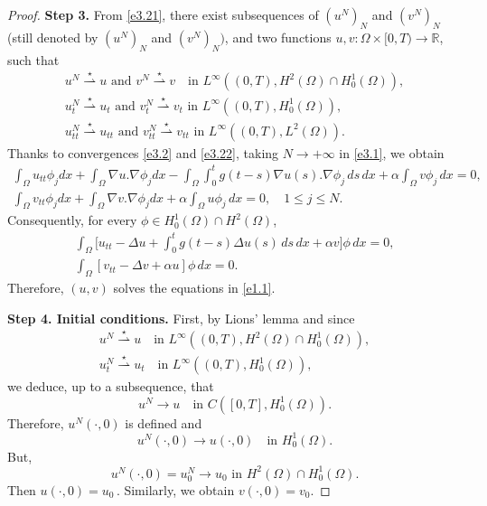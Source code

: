 \documentclass[11pt]{article}
\numberwithin{equation}{section}
\begin{document}
\begin{proof}
\noindent\textbf{Step 3.}
From \eqref{e3.21}, there exist subsequences of $(u^{N})_{N}$ and $(v^{N})_{N}$
(still denoted by $(u^{N})_{N}$ and $(v^{N})_{N})$, and two functions
$u, v : \Omega \times [0, T) \to \mathbb{R}$, such that
\begin{equation}
\begin{gathered}
u^{N} \overset{\star}{\rightharpoonup} u \text{ and }
 v^{N} \overset{\star}{\rightharpoonup} v \quad \text{in }
 L^\infty((0,T), H^2(\Omega) \cap H_0^1 (\Omega)), \\
u_{t}^{N} \overset{\star}{\rightharpoonup} u_{t} \text{ and }
 v_{t}^{N} \overset{\star}{\rightharpoonup} v_{t} \text{ in } L^\infty((0,T),
 H^1_0(\Omega)), \\
 u_{tt}^{N} \overset{\star}{\rightharpoonup} u_{tt} \text{ and }
 v_{tt}^{N} \overset{\star}{\rightharpoonup} v_{tt} \text{ in }
 L^\infty((0,T), L^2(\Omega)).
\end{gathered}\label{e3.22}
\end{equation}
Thanks to convergences \eqref{e3.2} and \eqref{e3.22}, taking $N \to +\infty$
in \eqref{e3.1}, we obtain
\begin{equation}
\begin{gathered}
\int_\Omega u_{tt}\phi_j dx + \int_\Omega \nabla u .\nabla \phi_j dx
- \int_\Omega \int_0^t g(t-s) \nabla u(s) .\nabla \phi_j\, ds\, dx
+ \alpha \int_\Omega v \phi_j \, dx = 0,\\
\int_\Omega v_{tt} \phi_j dx + \int_\Omega \nabla v.\nabla \phi_j dx
+ \alpha \int_\Omega u \phi_j \, dx = 0,\quad 1\leq j\leq N.
\end{gathered} \label{e3.23}
\end{equation}
 Consequently, for every $ \phi \in H_0^1(\Omega)\cap H^2(\Omega)$,
\begin{gather*}
\int_\Omega \Big[ u_{tt}- \Delta u + \int_0^t g(t-s) \Delta u(s)\, ds\,dx
 + \alpha v\Big] \phi \, dx = 0,\\
\int_\Omega [ v_{tt} - \Delta v + \alpha u] \phi \, dx = 0.
\end{gather*}
Therefore, $(u,v)$ solves the equations in \eqref{e1.1}.
\smallskip

\noindent\textbf{Step 4. Initial conditions.}
First, by Lions' lemma \cite{Lions} and since
\begin{gather*}
u^{N} \overset{\star}{\rightharpoonup} u \quad \text{in }
 L^\infty((0,T), H^2(\Omega) \cap H_0^1 (\Omega)), \\
u_{t}^{N} \overset{\star}{\rightharpoonup} u_{t} \quad \text{in }
 L^\infty((0,T), H^1_0(\Omega)),
\end{gather*}
we deduce, up to a subsequence, that
\begin{equation}
u^{N} \to u \quad \text{in } C([0, T], H^1_0(\Omega)).\label{e3.24}
\end{equation}
Therefore, \( u^{N}(\cdot, 0) \) is defined and
\[
u^{N}(\cdot, 0) \to u(\cdot, 0) \quad \text{in } H^1_0(\Omega).
\]
But,
\[ u^{N}(\cdot, 0) = u^{N}_0 \to u_0 \,\, \text{in}\,\, H^2(\Omega) \cap H^1_0(\Omega).\] Then \( u(\cdot, 0) = u_0 \, \). Similarly, we obtain $v(\cdot, 0)=v_0. $


\end{proof}
\end{document}

